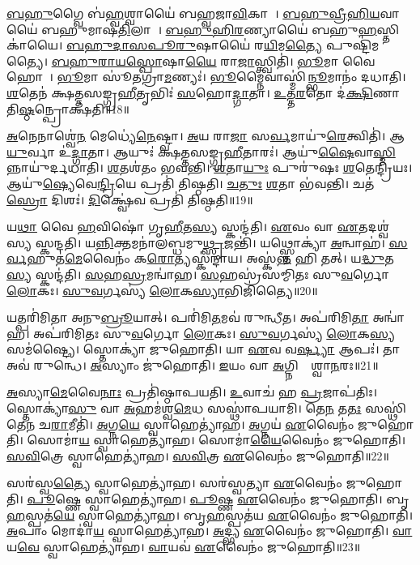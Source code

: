 \ul{𑌬}\ul{𑌹𑍁}𑌗𑍍𑌵𑍈 𑌬॑\ul{𑌹𑍍𑌵}𑌶𑍍𑌵𑌾𑌯𑍈॑ 𑌬𑌹𑍍𑌵𑌜𑌾\ul{𑌵𑌿}𑌕𑌾𑌯𑍈᳚।
\ul{𑌬}\ul{𑌹𑍁}\ul{𑌵𑍍𑌰𑍀}\ul{𑌹𑌿}\ul{𑌯}𑌵𑌾𑌯𑍈॑ 𑌬𑌹𑍁𑌮𑌾𑌷\ul{𑌤𑌿}𑌲𑌾𑌯𑍈᳚।
\ul{𑌬}\ul{𑌹𑍁}\ul{𑌹𑌿}\ul{𑌰}𑌣𑍍𑌯𑌾𑌯𑍈॑ 𑌬𑌹𑍁\ul{𑌹}𑌸𑍍𑌤𑌿𑌕𑌾॑𑌯𑍈।
\ul{𑌬}\ul{𑌹𑍁}\ul{𑌦𑌾}\ul{𑌸}\-\ul{𑌪𑍂}\ul{𑌰𑍁}𑌷𑌾𑌯𑍈॑ 𑌰\ul{𑌯𑌿}𑌮\ul{𑌤𑍍𑌯𑍈} 𑌪𑍁𑌷𑍍𑌟𑌿॑𑌮𑌤𑍍𑌯𑍈।
\ul{𑌬}\ul{𑌹𑍁}\ul{𑌰𑌾}\ul{𑌯}\ul{𑌸𑍍𑌪𑍋}𑌷𑌾\ul{𑌯𑍈} 𑌰𑌾\ul{𑌜𑌾}𑌸𑍍𑌤𑍍𑌵𑌿𑌤𑌿॑।
\ul{𑌭𑍂}𑌮𑌾 𑌵𑍈 𑌹𑍋𑌤𑌾᳚।
\ul{𑌭𑍂}𑌮𑌾 𑌸𑍂॑𑌤𑌗𑍍𑌰𑌾\ul{𑌮}𑌣𑍍𑌯𑌃॑।
\ul{𑌭𑍂}𑌮𑍍𑌨𑍈𑌵𑌾𑌸𑍍𑌮𑌿॑\ul{𑌨𑍍𑌭𑍂}𑌮𑌾𑌨𑌂॑ 𑌦𑌧𑌾𑌤𑌿।
\ul{𑌶}𑌤𑍇𑌨॑ 𑌕𑍍𑌷𑌤𑍍𑌤𑌸𑌙𑍍𑌗𑍍𑌰\ul{𑌹𑍀}𑌤𑍃𑌭𑌿𑌃॑ \ul{𑌸}𑌹𑍋\ul{𑌦𑍍𑌗𑌾}𑌤𑌾।
\ul{𑌉}\ul{𑌤𑍍𑌤}\ul{𑌰}𑌤𑍋 𑌦॑\ul{𑌕𑍍𑌷𑌿}𑌣𑌾 𑌤𑌿\ul{𑌷𑍍𑌠}𑌨𑍍𑌪𑍍𑌰𑍋𑌕𑍍𑌷॑𑌤𑌿॥18॥

\ul{𑌅}𑌨𑍇𑌨𑌾𑌶𑍍𑌵𑍇॑\ul{𑌨} 𑌮𑍇𑌧𑍍𑌯𑍇॑\ul{𑌨𑍇}𑌷𑍍𑌟𑍍𑌵𑌾।
\ul{𑌅}𑌯 𑌰𑌾\ul{𑌜𑌾} 𑌸\ul{𑌰𑍍𑌵}𑌮𑌾𑌯𑍁॑\ul{𑌰𑍇}𑌤𑍍𑌵𑌿𑌤𑌿॑।
𑌆\ul{𑌯𑍁}𑌰𑍍𑌵𑌾 𑌉॑\ul{𑌦𑍍𑌗𑌾}𑌤𑌾।
𑌆𑌯𑍁𑌃॑ 𑌕𑍍𑌷𑌤𑍍𑌤𑌸𑌙𑍍𑌗𑍍𑌰\ul{𑌹𑍀}𑌤𑌾𑌰𑌃॑।
𑌆𑌯𑍁॑\ul{𑌷𑍈}𑌵𑌾\ul{𑌸𑍍𑌮𑌿}𑌨𑍍𑌨𑌾𑌯𑍁॑𑌰𑍍𑌦\-𑌧𑌾𑌤𑌿।
\ul{𑌶}𑌤𑌶॑𑌤𑌂 𑌭𑌵𑌨𑍍𑌤𑌿।
\ul{𑌶}𑌤𑌾\ul{𑌯𑍁𑌃} 𑌪𑍁𑌰𑍁॑𑌷𑌃 \ul{𑌶}𑌤𑍇𑌨𑍍𑌦𑍍𑌰𑌿॑𑌯𑌃।
𑌆𑌯𑍁॑\ul{𑌷𑍍𑌯𑍇}𑌵𑍇\ul{𑌨𑍍𑌦𑍍𑌰𑌿}𑌯𑍇 𑌪𑍍𑌰𑌤𑌿॑ 𑌤𑌿𑌷𑍍𑌠𑌤𑌿।
\ul{𑌚}\ul{𑌤𑍁𑌃} \ul{𑌶}𑌤𑌾 𑌭॑𑌵𑌨𑍍𑌤𑌿।
𑌚𑌤॑\ul{𑌸𑍍𑌰𑍋} 𑌦𑌿𑌶𑌃॑।
\ul{𑌦𑌿}𑌕𑍍𑌷𑍍𑌵𑍇॑𑌵 𑌪𑍍𑌰𑌤𑌿॑ 𑌤𑌿𑌷𑍍𑌠𑌤𑌿॥19॥\anuvakamend[\ul{𑌬𑍍𑌰}𑌹𑍍𑌮𑌾 \ul{𑌵𑌿}𑌶 𑌉॑𑌕𑍍𑌷\ul{𑌤𑌿} 𑌦𑌿\ul{𑌶} 𑌏𑌕𑌂॑ 𑌚]

𑌯\ul{𑌥𑌾} 𑌵𑍈 \ul{𑌹}𑌵𑌿𑌷𑍋॑ 𑌗𑍃\ul{𑌹𑍀}𑌤\ul{𑌸𑍍𑌯} 𑌸𑍍𑌕𑌨𑍍𑌦॑𑌤𑌿।
\ul{𑌏}𑌵𑌂 𑌵𑌾 \ul{𑌏}𑌤𑌦𑌶𑍍𑌵॑𑌸𑍍𑌯 𑌸𑍍𑌕𑌨𑍍𑌦𑌤𑌿।
𑌯\ul{𑌨𑍍𑌨𑌿}𑌕𑍍𑌤𑌮𑌨𑌾॑𑌲𑌬𑍍𑌧𑌮𑍁\ul{𑌥𑍍𑌸𑍃}𑌜𑌨𑍍𑌤𑌿॑।
𑌯𑌥𑍍𑌸𑍍𑌤𑍋𑌕𑍍𑌯𑌾॑ \ul{𑌅}𑌨𑍍𑌵𑌾𑌹॑।
\ul{𑌸}\ul{𑌰𑍍𑌵}𑌹𑍁𑌤॑\ul{𑌮𑍇}𑌵𑍈𑌨𑌂॑ 𑌕\ul{𑌰𑍋}𑌤𑍍𑌯𑌸𑍍𑌕॑𑌨𑍍𑌦𑌾𑌯।
𑌅𑌸𑍍𑌕॑\ul{𑌨𑍍𑌨}\ul{} 𑌹𑌿 𑌤𑌤𑍍।
𑌯\ul{𑌦𑍍𑌧𑍁}𑌤\ul{𑌸𑍍𑌯} 𑌸𑍍𑌕𑌨𑍍𑌦॑𑌤𑌿।
\ul{𑌸}𑌹\ul{𑌸𑍍𑌰}𑌮𑌨𑍍𑌵𑌾॑𑌹।
\ul{𑌸}𑌹𑌸𑍍𑌰॑𑌸𑌮𑍍𑌮𑌿𑌤𑌃 𑌸𑍁\ul{𑌵}𑌰𑍍𑌗𑍋 \ul{𑌲𑍋}𑌕𑌃।
\ul{𑌸𑍁}\ul{𑌵}𑌰𑍍𑌗𑌸𑍍𑌯॑ \ul{𑌲𑍋}𑌕\ul{𑌸𑍍𑌯𑌾}𑌭𑌿𑌜𑌿॑𑌤𑍍𑌯𑍈॥20॥

𑌯𑌤𑍍𑌪𑌰𑌿॑𑌮𑌿𑌤𑌾 𑌅𑌨𑍁\ul{𑌬𑍍𑌰𑍂}𑌯𑌾𑌤𑍍।
𑌪𑌰𑌿॑𑌮𑌿\ul{𑌤}𑌮𑌵॑ 𑌰𑍁𑌨𑍍𑌧𑍀𑌤।
𑌅𑌪॑𑌰𑌿𑌮𑌿\ul{𑌤𑌾} 𑌅𑌨𑍍𑌵𑌾॑𑌹।
𑌅𑌪॑𑌰𑌿𑌮𑌿𑌤𑌃 𑌸𑍁\ul{𑌵}𑌰𑍍𑌗𑍋 \ul{𑌲𑍋}𑌕𑌃।
\ul{𑌸𑍁}\ul{𑌵}𑌰𑍍𑌗𑌸𑍍𑌯॑ \ul{𑌲𑍋}𑌕\ul{𑌸𑍍𑌯} 𑌸𑌮॑𑌷𑍍𑌟𑍍𑌯𑍈।
𑌸𑍍𑌤𑍋𑌕𑍍𑌯𑌾॑ 𑌜𑍁𑌹𑍋𑌤𑌿।
𑌯𑌾 \ul{𑌏}𑌵 𑌵\ul{𑌰𑍍𑌷𑍍𑌯𑌾} 𑌆𑌪𑌃॑।
𑌤𑌾 𑌅𑌵॑ 𑌰𑍁𑌨𑍍𑌧𑍇।
\ul{𑌅}𑌸𑍍𑌯𑌾𑌂 𑌜𑍁॑𑌹𑍋𑌤𑌿।
\ul{𑌇}𑌯𑌂 𑌵𑌾 \ul{𑌅}𑌗𑍍𑌨𑌿𑌰𑍍𑌵𑍈᳚𑌶𑍍𑌵𑌾\ul{𑌨}𑌰𑌃॥21॥

\ul{𑌅}𑌸𑍍𑌯𑌾\ul{𑌮𑍇}𑌵𑍈\ul{𑌨𑌾𑌃} 𑌪𑍍𑌰𑌤𑌿॑\-𑌷𑍍𑌠𑌾𑌪𑌯𑌤𑌿।
\ul{𑌉}𑌵𑌾𑌚॑ 𑌹 \ul{𑌪𑍍𑌰}𑌜𑌾𑌪॑𑌤𑌿𑌃।
𑌸𑍍𑌤𑍋𑌕𑍍𑌯𑌾॑\ul{𑌸𑍁} 𑌵𑌾 \ul{𑌅}𑌹𑌮॑𑌶𑍍𑌵\ul{𑌮𑍇}𑌧 𑌸𑌸𑍍𑌥𑌾॑𑌪𑌯𑌾𑌮𑌿।
𑌤𑍇\ul{𑌨} 𑌤\ul{𑌤𑌃} 𑌸𑌸𑍍𑌥𑌿॑𑌤𑍇𑌨 𑌚\ul{𑌰𑌾}𑌮𑍀𑌤𑌿॑।
\ul{𑌅}𑌗𑍍𑌨\ul{𑌯𑍇} 𑌸𑍍𑌵𑌾𑌹𑍇𑌤𑍍𑌯𑌾॑𑌹।
\ul{𑌅}𑌗𑍍𑌨𑌯॑ \ul{𑌏}𑌵𑍈𑌨𑌂॑ 𑌜𑍁𑌹𑍋𑌤𑌿।
𑌸𑍋𑌮𑌾॑\ul{𑌯} 𑌸𑍍𑌵𑌾𑌹𑍇𑌤𑍍𑌯𑌾॑𑌹।
𑌸𑍋𑌮𑌾॑\ul{𑌯𑍈}𑌵𑍈𑌨𑌂॑ 𑌜𑍁𑌹𑍋𑌤𑌿।
\ul{𑌸}\ul{𑌵𑌿}𑌤𑍍𑌰𑍇 𑌸𑍍𑌵𑌾𑌹𑍇𑌤𑍍𑌯𑌾॑𑌹।
\ul{𑌸}\ul{𑌵𑌿}𑌤𑍍𑌰 \ul{𑌏}𑌵𑍈𑌨𑌂॑ 𑌜𑍁𑌹𑍋𑌤𑌿॥22॥

𑌸𑌰॑𑌸𑍍𑌵\ul{𑌤𑍍𑌯𑍈} 𑌸𑍍𑌵𑌾𑌹𑍇𑌤𑍍𑌯𑌾॑𑌹।
𑌸𑌰॑𑌸𑍍𑌵𑌤𑍍𑌯𑌾 \ul{𑌏}𑌵𑍈𑌨𑌂॑ 𑌜𑍁𑌹𑍋𑌤𑌿।
\ul{𑌪𑍂}𑌷𑍍𑌣𑍇 𑌸𑍍𑌵𑌾𑌹𑍇𑌤𑍍𑌯𑌾॑𑌹।
\ul{𑌪𑍂}𑌷𑍍𑌣 \ul{𑌏}𑌵𑍈𑌨𑌂॑ 𑌜𑍁𑌹𑍋𑌤𑌿।
𑌬𑍃\ul{𑌹}𑌸𑍍𑌪𑌤॑\ul{𑌯𑍇} 𑌸𑍍𑌵𑌾𑌹𑍇𑌤𑍍𑌯𑌾॑𑌹।
𑌬𑍃\ul{𑌹}𑌸𑍍𑌪𑌤॑𑌯 \ul{𑌏}𑌵𑍈𑌨𑌂॑ 𑌜𑍁𑌹𑍋𑌤𑌿।
\ul{𑌅}𑌪𑌾𑌂 𑌮𑍋𑌦𑌾॑\ul{𑌯} 𑌸𑍍𑌵𑌾𑌹𑍇𑌤𑍍𑌯𑌾॑𑌹।
\ul{𑌅}𑌦𑍍𑌭𑍍𑌯 \ul{𑌏}𑌵𑍈𑌨𑌂॑ 𑌜𑍁𑌹𑍋𑌤𑌿।
\ul{𑌵𑌾}𑌯\ul{𑌵𑍇} 𑌸𑍍𑌵𑌾𑌹𑍇𑌤𑍍𑌯𑌾॑𑌹।
\ul{𑌵𑌾}𑌯𑌵॑ \ul{𑌏}𑌵𑍈𑌨𑌂॑ 𑌜𑍁𑌹𑍋𑌤𑌿॥23॥

